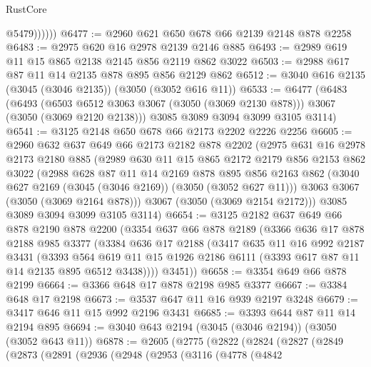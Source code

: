 \begin{lexlean}{RustCore}
\begin{coremodule}
                @5479))))))
@6477 := @2960 @621 @650 @678 @66 @2139 @2148 @878 @2258
@6483 := @2975 @620 @16 @2978 @2139 @2146 @885
@6493 := @2989 @619 @11 @15 @865 @2138 @2145 @856 @2119 @862 @3022
@6503 := @2988 @617 @87 @11 @14 @2135 @878 @895 @856 @2129 @862
@6512 := @3040 @616 @2135 (@3045 (@3046 @2135)) (@3050 (@3052 @616 @11))
@6533 := @6477
    (@6483
      (@6493 (@6503 @6512 @3063 @3067 (@3050 (@3069 @2130 @878))) @3067 (@3050 (@3069 @2120 @2138)))
      @3085
      @3089
      @3094
      @3099
      @3105
      @3114)
@6541 := @3125 @2148 @650 @678 @66 @2173 @2202 @2226 @2256
@6605 := @2960
    @632
    @637
    @649
    @66
    @2173
    @2182
    @878
    @2202
    (@2975
      @631
      @16
      @2978
      @2173
      @2180
      @885
      (@2989
        @630
        @11
        @15
        @865
        @2172
        @2179
        @856
        @2153
        @862
        @3022
        (@2988
          @628
          @87
          @11
          @14
          @2169
          @878
          @895
          @856
          @2163
          @862
          (@3040 @627 @2169 (@3045 (@3046 @2169)) (@3050 (@3052 @627 @11)))
          @3063
          @3067
          (@3050 (@3069 @2164 @878)))
        @3067
        (@3050 (@3069 @2154 @2172)))
      @3085
      @3089
      @3094
      @3099
      @3105
      @3114)
@6654 := @3125
    @2182
    @637
    @649
    @66
    @878
    @2190
    @878
    @2200
    (@3354
      @637
      @66
      @878
      @2189
      (@3366
        @636
        @17
        @878
        @2188
        @985
        @3377
        (@3384
          @636
          @17
          @2188
          (@3417
            @635
            @11
            @16
            @992
            @2187
            @3431
            (@3393
              @564
              @619
              @11
              @15
              @1926
              @2186
              @6111
              (@3393 @617 @87 @11 @14 @2135 @895 @6512 @3438))))
        @3451))
@6658 := @3354 @649 @66 @878 @2199
@6664 := @3366 @648 @17 @878 @2198 @985 @3377
@6667 := @3384 @648 @17 @2198
@6673 := @3537 @647 @11 @16 @939 @2197 @3248
@6679 := @3417 @646 @11 @15 @992 @2196 @3431
@6685 := @3393 @644 @87 @11 @14 @2194 @895
@6694 := @3040 @643 @2194 (@3045 (@3046 @2194)) (@3050 (@3052 @643 @11))
@6878 := @2605
    (@2775
      (@2822
        (@2824
          (@2827
            (@2849
              (@2873
                (@2891
                  (@2936
                    (@2948
                      (@2953
                        (@3116
                          (@4778
                            (@4842

\end{coremodule}
\end{lexlean}
